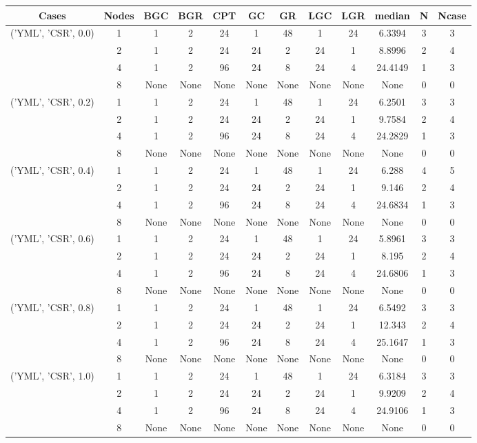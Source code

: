 \begin{tabular}{cccccccccccc}
\hline
Cases & Nodes& BGC& BGR& CPT& GC& GR& LGC& LGR& median & N & Ncase \\
\hline
\multirow{4}{*}{('YML', 'CSR', 0.0)}& 1& 1& 2& 24& 1& 48& 1& 24& 6.3394& 3& 3\\
& 2& 1& 2& 24& 24& 2& 24& 1& 8.8996& 2& 4\\
& 4& 1& 2& 96& 24& 8& 24& 4& 24.4149& 1& 3\\
& 8& None& None& None& None& None& None& None& None& 0& 0\\
\hline
\multirow{4}{*}{('YML', 'CSR', 0.2)}& 1& 1& 2& 24& 1& 48& 1& 24& 6.2501& 3& 3\\
& 2& 1& 2& 24& 24& 2& 24& 1& 9.7584& 2& 4\\
& 4& 1& 2& 96& 24& 8& 24& 4& 24.2829& 1& 3\\
& 8& None& None& None& None& None& None& None& None& 0& 0\\
\hline
\multirow{4}{*}{('YML', 'CSR', 0.4)}& 1& 1& 2& 24& 1& 48& 1& 24& 6.288& 4& 5\\
& 2& 1& 2& 24& 24& 2& 24& 1& 9.146& 2& 4\\
& 4& 1& 2& 96& 24& 8& 24& 4& 24.6834& 1& 3\\
& 8& None& None& None& None& None& None& None& None& 0& 0\\
\hline
\multirow{4}{*}{('YML', 'CSR', 0.6)}& 1& 1& 2& 24& 1& 48& 1& 24& 5.8961& 3& 3\\
& 2& 1& 2& 24& 24& 2& 24& 1& 8.195& 2& 4\\
& 4& 1& 2& 96& 24& 8& 24& 4& 24.6806& 1& 3\\
& 8& None& None& None& None& None& None& None& None& 0& 0\\
\hline
\multirow{4}{*}{('YML', 'CSR', 0.8)}& 1& 1& 2& 24& 1& 48& 1& 24& 6.5492& 3& 3\\
& 2& 1& 2& 24& 24& 2& 24& 1& 12.343& 2& 4\\
& 4& 1& 2& 96& 24& 8& 24& 4& 25.1647& 1& 3\\
& 8& None& None& None& None& None& None& None& None& 0& 0\\
\hline
\multirow{4}{*}{('YML', 'CSR', 1.0)}& 1& 1& 2& 24& 1& 48& 1& 24& 6.3184& 3& 3\\
& 2& 1& 2& 24& 24& 2& 24& 1& 9.9209& 2& 4\\
& 4& 1& 2& 96& 24& 8& 24& 4& 24.9106& 1& 3\\
& 8& None& None& None& None& None& None& None& None& 0& 0\\
\hline
\end{tabular}
